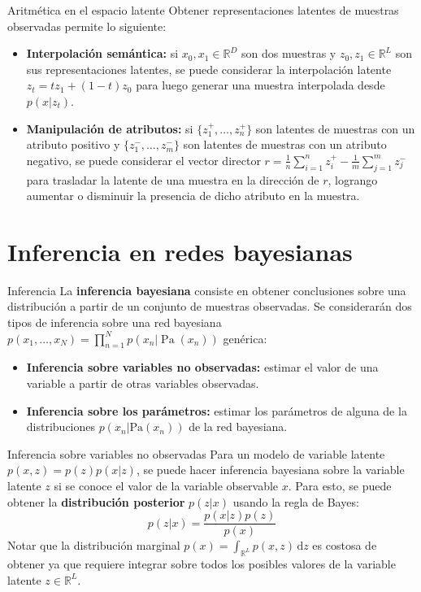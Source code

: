 \documentclass{beamer}
\newcommand{\R}{\mathbb{R}}
\begin{document}
\begin{frame}{Aritmética en el espacio latente}
    Obtener representaciones latentes de muestras observadas permite lo siguiente:
    \begin{itemize}
        \item \textbf{Interpolación semántica:} si $x_0,x_1\in\R^D$ son dos muestras y $z_0,z_1\in\R^L$ son sus representaciones latentes, se puede considerar la interpolación latente $z_t=tz_1+(1-t)z_0$ para luego generar una muestra interpolada desde $p(x|z_t)$.
        \item \textbf{Manipulación de atributos:} si $\{z^+_1,\ldots,z^+_n\}$ son latentes de muestras con un atributo positivo y $\{z^-_1,\ldots,z^-_m\}$ son latentes de muestras con un atributo negativo, se puede considerar el vector director $r=\frac{1}{n}\sum_{i=1}^n z^+_i-\frac{1}{m}\sum_{j=1}^m z^-_j$ para trasladar la latente de una muestra en la dirección de $r$, logrango aumentar o disminuir la presencia de dicho atributo en la muestra.
    \end{itemize}
\end{frame}

\section{Inferencia en redes bayesianas}

\begin{frame}{Inferencia}
    La \textbf{inferencia bayesiana} consiste en obtener conclusiones sobre una distribución a partir de un conjunto de muestras observadas. Se considerarán dos tipos de inferencia sobre una red bayesiana $p(x_1,\ldots,x_N)=\prod_{n=1}^N p(x_n|\operatorname{Pa}(x_n))$ genérica:
    \begin{itemize}
        \item \textbf{Inferencia sobre variables no observadas:} estimar el valor de una variable a partir de otras variables observadas.
        \item \textbf{Inferencia sobre los parámetros:} estimar los parámetros de alguna de la distribuciones $p(x_n|\text{Pa}(x_n))$ de la red bayesiana.
    \end{itemize}
\end{frame}

\begin{frame}{Inferencia sobre variables no observadas}
    Para un modelo de variable latente $p(x,z)=p(z)p(x|z)$, se puede hacer inferencia bayesiana sobre la variable latente $z$ si se conoce el valor de la variable observable $x$. Para esto, se puede obtener la \textbf{distribución posterior} $p(z|x)$ usando la regla de Bayes:
    \begin{equation*}
        p(z|x) = \frac{p(x|z)p(z)}{p(x)}
    \end{equation*}
    Notar que la distribución marginal $p(x)=\int_{\R^L}p(x,z) \,\text{d}z$ es costosa de obtener ya que requiere integrar sobre todos los posibles valores de la variable latente $z\in\R^L$.
\end{frame}
\end{document}
